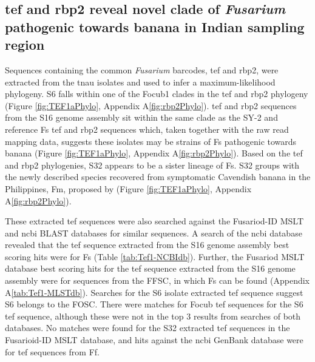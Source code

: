 \subsection{\Acl{tef} and \acl{rbp2} reveal novel clade of \textit{Fusarium} pathogenic towards banana in Indian sampling region}
\label{sec:chap2phylogenies}

 Sequences containing the common \textit{Fusarium} barcodes, \acf{tef}  and \acf{rbp2}, were extracted from the \ac{tnau} isolates and used to infer a maximum-likelihood phylogeny. S6 falls within one of the \ac{Focub1} clades in the \acs{tef} and \ac{rbp2} phylogeny (Figure \ref{fig:TEF1aPhylo}, Appendix A\ref{fig:rbp2Phylo}). \Ac{tef} and \ac{rbp2} sequences from the S16 genome assembly sit within the same clade as the SY-2 and reference \ac{Fs} \ac{tef} and \ac{rbp2} sequences which, taken together with the raw read mapping data, suggests these isolates may be strains of \ac{Fs} pathogenic towards banana (Figure \ref{fig:TEF1aPhylo}, Appendix A\ref{fig:rbp2Phylo}). Based on the \ac{tef} and \ac{rbp2} phylogenies, S32 appears to be a sister lineage of \ac{Fs}. S32 groups with the newly described species recovered from symptomatic Cavendish banana in the Philippines, \acf{Fm}, proposed by \textcite{Nozawa2023}  (Figure \ref{fig:TEF1aPhylo}, Appendix A\ref{fig:rbp2Phylo}). 

These extracted \ac{tef} sequences were also searched against the Fusariod-ID MSLT and \ac{ncbi} BLAST databases for similar sequences. A search of the \ac{ncbi} database revealed that the \ac{tef} sequence extracted from the S16 genome assembly best scoring hits were for \ac{Fs} (Table \ref{tab:Tef1-NCBIdb}). Further, the Fusariod MSLT database best scoring hits for the \ac{tef} sequence extracted from the S16 genome assembly were for sequences from the \ac{FFSC}, in which \ac{Fs} can be found (Appendix A\ref{tab:Tef1-MLSTdb}). Searches for the S6 isolate extracted \ac{tef} sequence suggest S6 belongs to the \ac{FOSC}. There were matches for \ac{Focub} \ac{tef} sequences for the S6 \ac{tef} sequence, although these were not in the top 3 results from searches of both databases. No matches were found for the S32 extracted \ac{tef} sequences in the Fusarioid-ID MSLT database, and hits against the \ac{ncbi} GenBank database were for \ac{tef} sequences from \ac{Ff}. 



